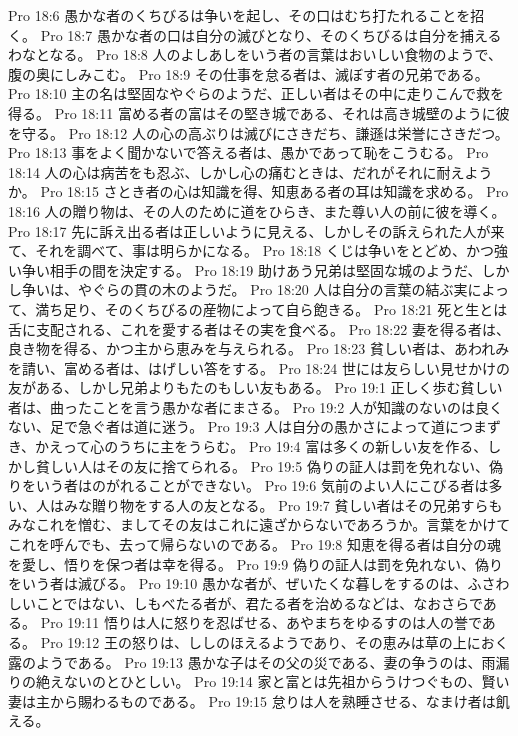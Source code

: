 Pro 18:6  愚かな者のくちびるは争いを起し、その口はむち打たれることを招く。
Pro 18:7  愚かな者の口は自分の滅びとなり、そのくちびるは自分を捕えるわなとなる。
Pro 18:8  人のよしあしをいう者の言葉はおいしい食物のようで、腹の奥にしみこむ。
Pro 18:9  その仕事を怠る者は、滅ぼす者の兄弟である。
Pro 18:10  主の名は堅固なやぐらのようだ、正しい者はその中に走りこんで救を得る。
Pro 18:11  富める者の富はその堅き城である、それは高き城壁のように彼を守る。
Pro 18:12  人の心の高ぶりは滅びにさきだち、謙遜は栄誉にさきだつ。
Pro 18:13  事をよく聞かないで答える者は、愚かであって恥をこうむる。
Pro 18:14  人の心は病苦をも忍ぶ、しかし心の痛むときは、だれがそれに耐えようか。
Pro 18:15  さとき者の心は知識を得、知恵ある者の耳は知識を求める。
Pro 18:16  人の贈り物は、その人のために道をひらき、また尊い人の前に彼を導く。
Pro 18:17  先に訴え出る者は正しいように見える、しかしその訴えられた人が来て、それを調べて、事は明らかになる。
Pro 18:18  くじは争いをとどめ、かつ強い争い相手の間を決定する。
Pro 18:19  助けあう兄弟は堅固な城のようだ、しかし争いは、やぐらの貫の木のようだ。
Pro 18:20  人は自分の言葉の結ぶ実によって、満ち足り、そのくちびるの産物によって自ら飽きる。
Pro 18:21  死と生とは舌に支配される、これを愛する者はその実を食べる。
Pro 18:22  妻を得る者は、良き物を得る、かつ主から恵みを与えられる。
Pro 18:23  貧しい者は、あわれみを請い、富める者は、はげしい答をする。
Pro 18:24  世には友らしい見せかけの友がある、しかし兄弟よりもたのもしい友もある。
Pro 19:1  正しく歩む貧しい者は、曲ったことを言う愚かな者にまさる。
Pro 19:2  人が知識のないのは良くない、足で急ぐ者は道に迷う。
Pro 19:3  人は自分の愚かさによって道につまずき、かえって心のうちに主をうらむ。
Pro 19:4  富は多くの新しい友を作る、しかし貧しい人はその友に捨てられる。
Pro 19:5  偽りの証人は罰を免れない、偽りをいう者はのがれることができない。
Pro 19:6  気前のよい人にこびる者は多い、人はみな贈り物をする人の友となる。
Pro 19:7  貧しい者はその兄弟すらもみなこれを憎む、ましてその友はこれに遠ざからないであろうか。言葉をかけてこれを呼んでも、去って帰らないのである。
Pro 19:8  知恵を得る者は自分の魂を愛し、悟りを保つ者は幸を得る。
Pro 19:9  偽りの証人は罰を免れない、偽りをいう者は滅びる。
Pro 19:10  愚かな者が、ぜいたくな暮しをするのは、ふさわしいことではない、しもべたる者が、君たる者を治めるなどは、なおさらである。
Pro 19:11  悟りは人に怒りを忍ばせる、あやまちをゆるすのは人の誉である。
Pro 19:12  王の怒りは、ししのほえるようであり、その恵みは草の上におく露のようである。
Pro 19:13  愚かな子はその父の災である、妻の争うのは、雨漏りの絶えないのとひとしい。
Pro 19:14  家と富とは先祖からうけつぐもの、賢い妻は主から賜わるものである。
Pro 19:15  怠りは人を熟睡させる、なまけ者は飢える。
